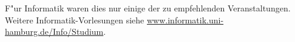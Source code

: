 \begin{tabularx}{\textwidth}{|l|X|X|X|}
%
			&&&\\
\hline
\end{tabularx}

F"ur Informatik waren dies nur einige der zu empfehlenden Veranstaltungen.
Weitere Informatik-Vorlesungen
siehe \url{www.informatik.uni-hamburg.de/Info/Studium}.

